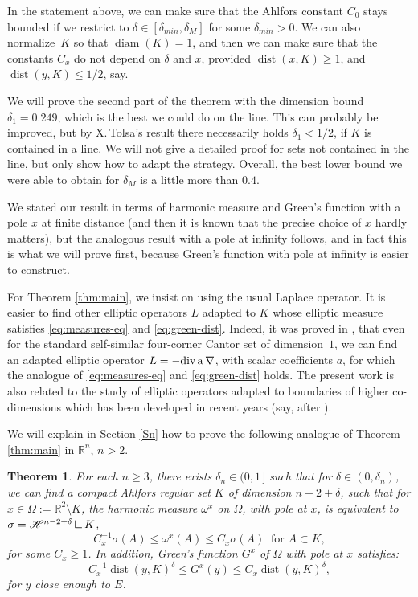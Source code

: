 \documentclass[JEP,XML,SOM,Unicode,published]{cedram}
\let\sm\setminus
\numberwithin{equation}{section}
\theoremstyle{plain}
\newtheorem{thm}[lem]{Theorem}
\theoremstyle{definition}
\newcommand{\R}{\mathbb{R}}
\let\sm\setminus
\DeclareMathOperator{\dist}{dist}
\newcommand{\R}{\mathbb{R}}
\DeclareMathOperator{\dist}{dist}
\DeclareMathOperator{\diam}{diam}
\newcommand{\mres}{\mathbin{\vrule height 1.6ex depth 0pt width
0.13ex\vrule height 0.13ex depth 0pt width 1.3ex}}
\begin{document}
In the statement above, we can make sure that the Ahlfors constant $C_0$ stays bounded
if we restrict to $\delta \in [\delta_{min},\delta_M]$ for some $\delta_{min} > 0$.
We can also normalize~$K$ so that $\diam(K) = 1$, and then we can make sure that the constants $C_x$ do not depend on $\delta$ and $x$, provided $\dist(x,K) \geq 1$, and $\dist(y, K) \leq 1/2$, say.

We will prove the second part of the theorem with the dimension bound $\delta_1 = 0.249$, which is the best we could do on the line.
This can probably be improved, but by X.\,Tolsa's result there necessarily holds $\delta_1 < 1/2$, if $K$ is contained in a line.
We will not give a detailed proof for sets not contained in the line, but only show how to adapt the strategy. Overall, the best lower bound we were able to obtain for $\delta_M$ is a little more than $0.4$.

We stated our result in terms of harmonic measure and Green's function with a pole
$x$ at finite distance (and then it is known that the precise choice of $x$ hardly matters),
but the analogous result with a pole at infinity follows, and in fact this is what we will prove
first, because Green's function with pole at infinity is easier to construct.

For Theorem \ref{thm:main}, we insist on using the usual Laplace operator. It is easier to find other elliptic operators $L$ adapted to $K$ whose elliptic measure
satisfies \eqref{eq:measures-eq} and \eqref{eq:green-dist}.
Indeed, it was proved in \cite{DavidMayboroda-good}, that even
for the standard self-similar four-corner Cantor set of dimension~$1$,
we can find an adapted elliptic operator
$L= -\rm{div} \, a \, \nabla$, with scalar coefficients $a$,
for which the analogue of \eqref{eq:measures-eq} and \eqref{eq:green-dist} holds.
The present work is also related to the study of elliptic operators adapted to boundaries of
higher co-dimensions which has been developed in recent years (say, after \cite{DFM-Memoirs}).

We will explain in Section \ref{Sn} how to prove the following analogue of
Theorem \ref{thm:main} in $\R^n$, $n > 2$.

\begin{thm}\label{thm:main2}
For each $n \geq 3$, there exists $\delta_n\in (0,1\,]$ such that for $\delta\in (0,\delta_n)$,
we can find a compact Ahlfors regular set $K$ of dimension $n-2+\delta$,
such that for $x\in \Omega := \R^2 \sm K$,
the harmonic measure $\omega^x$ on $\Omega$, with pole at $x$, is
equivalent to $\sigma = \mathscr{H}^{n-2+\delta} \mres K$, \ie
\begin{equation} \label{eq:measures-eq2}
C_x^{-1} \sigma(A) \leq \omega^x(A) \leq C_x \sigma(A)
\ \text{ for } A\subset K,
\end{equation}
for some $C_x \geq 1$.
In addition, Green's function $G^x$ of $\Omega$ with pole at $x$ satisfies:
\begin{equation}\label{eq:green-dist2}
C_x^{-1} \dist(y,K)^\delta \leq G^x(y) \leq C_x \dist(y,K)^\delta,
\end{equation}
for $y$ close enough to $E$.
\end{thm}
\end{document}
